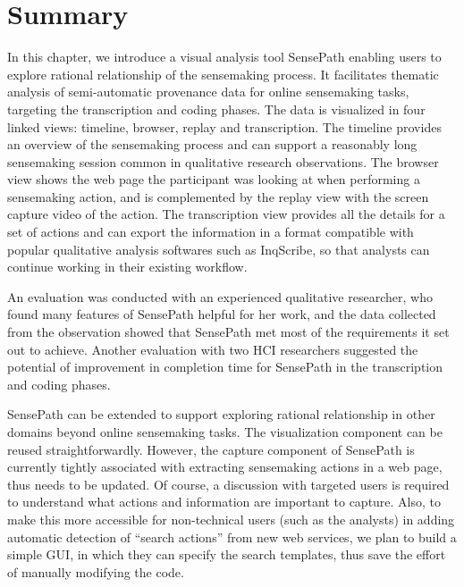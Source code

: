 \section{Summary}
In this chapter, we introduce a visual analysis tool SensePath enabling users to explore rational relationship of the sensemaking process. It facilitates thematic analysis of semi-automatic provenance data for online sensemaking tasks, targeting the transcription and coding phases. The data is visualized in four linked views: timeline, browser, replay and transcription. The timeline provides an overview of the sensemaking process and can support a reasonably long sensemaking session common in qualitative research observations. The browser view shows the web page the participant was looking at when performing a sensemaking action, and is complemented by the replay view with the screen capture video of the action. The transcription view provides all the details for a set of actions and can export the information in a format compatible with popular qualitative analysis softwares such as InqScribe, so that analysts can continue working in their existing workflow. 

An evaluation was conducted with an experienced qualitative researcher, who found many features of SensePath helpful for her work, and the data collected from the observation showed that SensePath met most of the requirements it set out to achieve. Another evaluation with two HCI researchers suggested the potential of improvement in completion time for SensePath in the transcription and coding phases.

SensePath can be extended to support exploring rational relationship in other domains beyond online sensemaking tasks. The visualization component can be reused straightforwardly. However, the capture component of SensePath is currently tightly associated with extracting sensemaking actions in a web page, thus needs to be updated. Of course, a discussion with targeted users is required to understand what actions and information are important to capture.  Also, to make this more accessible for non-technical users (such as the analysts) in adding automatic detection of ``search actions'' from new web services, we plan to build a simple GUI, in which they can specify the search templates, thus save the effort of manually modifying the code.